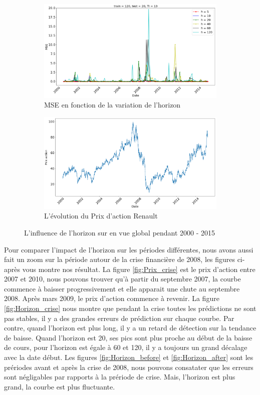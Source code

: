 \begin{figure}[H]
	\centering
	\begin{subfigure}{.5\textwidth}
	\includegraphics[width=.9\linewidth, scale=0.2]
	{plot/MSE_120_h_20.png}
	\caption{MSE en fonction de la variation de l'horizon}
	\label{fig:Horizon}
	\end{subfigure}%
	\begin{subfigure}{.5\textwidth}
	\centering
	\includegraphics[width=.9\linewidth, scale=0.2]
	{plot/Prix_action_global.png}
	\caption{L'évolution du Prix d'action Renault}
	\label{fig:Prix_action}
	\end{subfigure}
\caption{L'influence de l'horizon sur en vue global pendant 2000 - 2015}
\label{fig:Horizon_global}
\end{figure}

Pour comparer l'impact de l'horizon sur les périodes différentes, nous avons aussi fait un zoom sur la période autour de la crise financière de 2008, les figures ci-après vous montre nos résultat. La figure \ref{fig:Prix_crise} est le prix d'action entre 2007 et 2010, nous pouvons trouver qu'à partir du septembre 2007, la courbe commence à baisser progressivement et elle apparait une chute au septembre 2008. Après mars 2009, le prix d'action commence à revenir. La figure \ref{fig:Horizon_crise} nous montre que pendant la crise toutes les prédictions ne sont pas stables, il y a des grandes erreurs de prédiction sur chaque courbe. Par contre, quand l'horizon est plus long, il y a un retard de détection sur la tendance de baisse. Quand l'horizon est 20, ses pics sont plus proche au début de la baisse de cours, pour l'horizon est égale à 60 et 120, il y a toujours un grand décalage avec la date début. Les figures \ref{fig:Horizon_before} et \ref{fig:Horizon_after} sont les prériodes avant et après la crise de 2008, nous pouvons consatater que les erreurs sont négligables par rapports à la prériode de crise. Mais, l'horizon est plus grand, la courbe est plus fluctuante.

